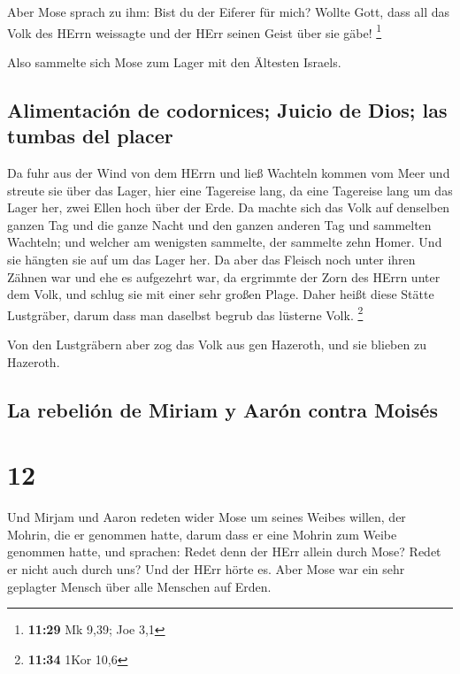  Aber Mose sprach zu ihm: Bist du der Eiferer für mich?
Wollte Gott, dass all das Volk des HErrn weissagte und der HErr seinen
Geist über sie gäbe! \footnote{\textbf{11:29} Mk 9,39; Joe 3,1}

 Also sammelte sich Mose zum Lager mit den Ältesten
Israels.

\hypertarget{alimentaciuxf3n-de-codornices-juicio-de-dios-las-tumbas-del-placer}{%
\subsection{Alimentación de codornices; Juicio de Dios; las tumbas del
placer}\label{alimentaciuxf3n-de-codornices-juicio-de-dios-las-tumbas-del-placer}}

 Da fuhr aus der Wind von dem HErrn und ließ Wachteln
kommen vom Meer und streute sie über das Lager, hier eine Tagereise
lang, da eine Tagereise lang um das Lager her, zwei Ellen hoch über der
Erde.  Da machte sich das Volk auf denselben ganzen Tag
und die ganze Nacht und den ganzen anderen Tag und sammelten Wachteln;
und welcher am wenigsten sammelte, der sammelte zehn Homer. Und sie
hängten sie auf um das Lager her.  Da aber das Fleisch
noch unter ihren Zähnen war und ehe es aufgezehrt war, da ergrimmte der
Zorn des HErrn unter dem Volk, und schlug sie mit einer sehr großen
Plage.  Daher heißt diese Stätte Lustgräber, darum dass
man daselbst begrub das lüsterne Volk. \footnote{\textbf{11:34} 1Kor
  10,6}

 Von den Lustgräbern aber zog das Volk aus gen Hazeroth,
und sie blieben zu Hazeroth.

\hypertarget{la-rebeliuxf3n-de-miriam-y-aaruxf3n-contra-moisuxe9s}{%
\subsection{La rebelión de Miriam y Aarón contra
Moisés}\label{la-rebeliuxf3n-de-miriam-y-aaruxf3n-contra-moisuxe9s}}

\hypertarget{section-11}{%
\section{12}\label{section-11}}

 Und Mirjam und Aaron redeten wider Mose um seines Weibes
willen, der Mohrin, die er genommen hatte, darum dass er eine Mohrin zum
Weibe genommen hatte,  und sprachen: Redet denn der HErr
allein durch Mose? Redet er nicht auch durch uns? Und der HErr hörte es.
 Aber Mose war ein sehr geplagter Mensch über alle
Menschen auf Erden.

